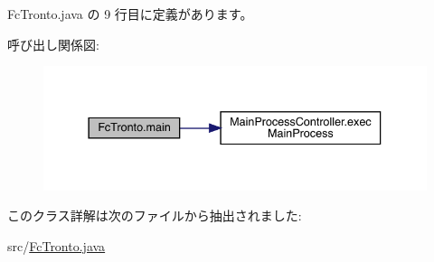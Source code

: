  Fc\+Tronto.\+java の 9 行目に定義があります。

呼び出し関係図\+:
\nopagebreak
\begin{figure}[H]
\begin{center}
\leavevmode
\includegraphics[width=337pt]{d0/d50/class_fc_tronto_a3e0328e996d4755d3624e9217c5848dc_cgraph}
\end{center}
\end{figure}


このクラス詳解は次のファイルから抽出されました\+:\begin{DoxyCompactItemize}
\item 
src/\mbox{\hyperlink{_fc_tronto_8java}{Fc\+Tronto.\+java}}\end{DoxyCompactItemize}
